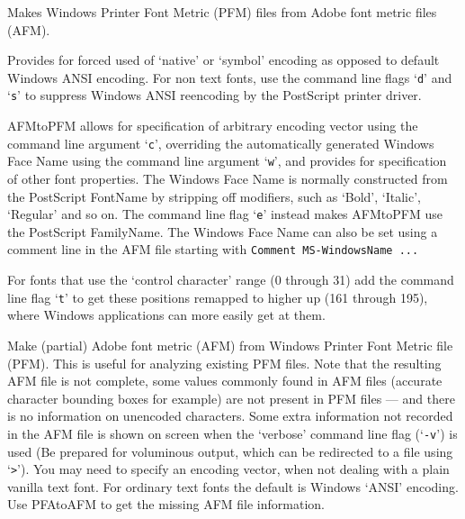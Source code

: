 
Makes Windows Printer Font Metric (PFM) files from Adobe
font metric files (AFM).  

Provides for forced used of `native' or `symbol'
encoding as opposed to default Windows ANSI encoding.
For non text fonts,
use the command line flags `{\tt d}' and `{\tt s}' to suppress
Windows ANSI reencoding by the Post\-Script printer driver.
%

AFMtoPFM allows for specification of arbitrary encoding vector using the
command line argument `{\tt c}',
overriding the automatically generated Windows Face Name
using the command line argument `{\tt w}', and provides
for specification of other font properties.
The Windows Face Name is normally constructed from the PostScript FontName 
by stripping off modifiers, such as `Bold', `Italic', `Regular' and so on.
The command line flag `{\tt e}' instead makes AFMtoPFM use the 
PostScript FamilyName. 
The Windows Face Name can also be set using a comment line
in the AFM file starting with 
{\tt Comment MS-WindowsName ...}

For fonts that use the `control character' range (0 through 31) add the
command line flag `{\tt t}' to get these
positions remapped to higher up (161 through 195), where Windows
applications can more easily get at them. 



Make (partial) Adobe font metric (AFM) from Windows Printer Font Metric
file (PFM).  This is useful for analyzing existing PFM files.
Note that the resulting AFM file is not complete,
some values commonly found in AFM files 
(accurate character bounding boxes for example)
are not present in PFM files ---
and there is no information on unencoded characters.
Some extra information not recorded in the AFM file is shown on
screen when the `verbose' command line flag (`{\tt -v}') is used
(Be prepared for voluminous output, which can be redirected
to a file using `{\tt >}').
You may need to specify an encoding vector, when not
dealing with a plain vanilla text font.
For ordinary text fonts the default is Windows `ANSI' encoding.
%
Use PFAtoAFM to get the missing AFM file information.

